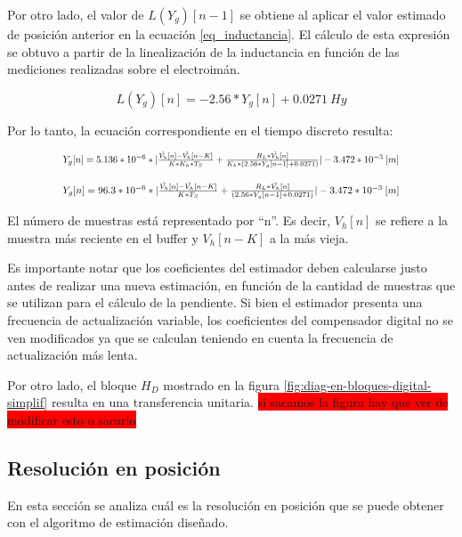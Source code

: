 Por otro lado, el valor de $L(Y_g)[n-1]$ se obtiene al aplicar el valor estimado de posición anterior en la ecuación \ref{eq_inductancia}. El cálculo de esta expresión se obtuvo a partir de la linealización de la inductancia en función de las mediciones realizadas sobre el electroimán.


\begin{equation} \label{eq_inductancia}
	L(Y_g)[n] = -2.56*Y_g[n]+0.0271\:Hy
\end{equation}

 Por lo tanto, la ecuación correspondiente en el tiempo discreto resulta:

\begin{equation}
	\resizebox{.8\hsize}{!}
	{
	$Y_g[n] = 5.136*10^{-6}*|\frac{\hat{V_h}[n]-\hat{V_h}[n-K]}{K*K_h*T_S} + \frac{R_L*\bar{V_h}[n]}{K_h*(2.56*Y_g[n-1]+0.0271)}|-3.472*10^{-3}\:[m]$
	}
\end{equation}

\begin{equation}
	\resizebox{.8\hsize}{!}
	{
	$
	Y_g[n] = 96.3*10^{-6}*|\frac{\hat{V_h}[n]-\hat{V_h}[n-K]}{K*T_S} + \frac{R_L*\bar{V_h}[n]}{(2.56*Y_g[n-1]+0.0271)}|-3.472*10^{-3}\:[m]
	$
	}
\end{equation}


El número de muestras está representado por ``n''. Es decir, $V_h[n]$ se refiere a la muestra más reciente en el buffer y $V_h[n-K]$ a la más vieja.

Es importante notar que los coeficientes del estimador deben calcularse justo antes de realizar una nueva estimación,  en función de la cantidad de muestras que se utilizan para el cálculo de la pendiente. Si bien el estimador presenta una frecuencia de actualización variable, los coeficientes del compensador digital no se ven modificados ya que se calculan teniendo en cuenta la frecuencia de actualización más lenta.

Por otro lado, el bloque $H_D$ mostrado en la figura \ref{fig:diag-en-bloques-digital-simplif} resulta en una transferencia unitaria.
 \colorbox{red}{si sacamos la figura hay que ver de modificar esto o sacarlo}

\subsection{Resolución en posición}

En esta sección se analiza cuál es la resolución en posición que se puede obtener con el algoritmo de estimación diseñado.

